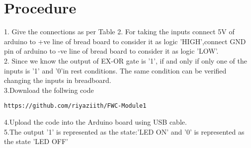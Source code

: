 \documentclass{IEEEtran}
\begin{document}
	\section{Procedure}

1. Give the connections as per Table 2. For taking the inputs connect 5V of arduino to +ve line of bread board to consider it as logic 'HIGH',connect GND pin of arduino to -ve line of bread board to consider it as logic 'LOW'.
\\2. Since we know the output of EX-OR gate is '1', if and only if only one of the inputs is '1' and '0'in rest conditions. The same condition can be verified changing the inputs in breadboard.
\\3.Download the follwing code
\begin{lstlisting}
https://github.com/riyaziith/FWC-Module1
\end{lstlisting}
 4.Upload the code into the Arduino board using USB cable.
\\5.The output '1' is represented as the state:'LED ON' and '0' is represented as the state 'LED OFF'
\end{document}
